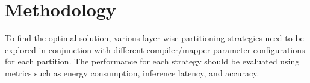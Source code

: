 \section{Methodology}
To find the optimal solution, various layer-wise partitioning strategies need to be explored in conjunction with different compiler/mapper parameter configurations for each partition.
The performance for each strategy should be evaluated using metrics such as energy consumption, inference latency, and accuracy.
